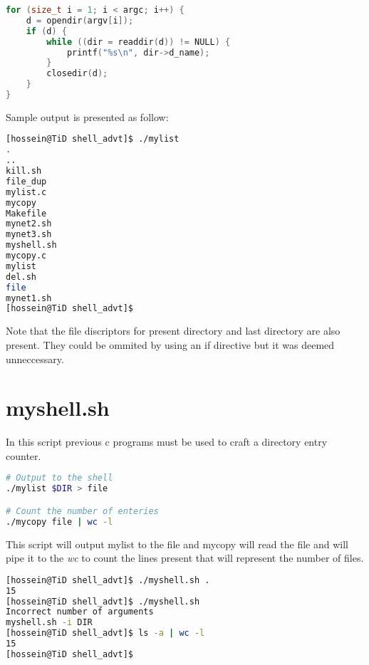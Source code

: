 \documentclass[a4paper, 11pt]{article}
\theoremstyle{nonumberplain}
\begin{document}
\begin{lstlisting}[language=c]
for (size_t i = 1; i < argc; i++) {
    d = opendir(argv[i]);
    if (d) {
        while ((dir = readdir(d)) != NULL) {
            printf("%s\n", dir->d_name);
        }
        closedir(d);
    }
}
\end{lstlisting}
Sample output is presented as follow:
\begin{lstlisting}[language=bash]
[hossein@TiD shell_advt]$ ./mylist
.
..
kill.sh
file_dup
mylist.c
mycopy
Makefile
mynet2.sh
mynet3.sh
myshell.sh
mycopy.c
mylist
del.sh
file
mynet1.sh
[hossein@TiD shell_advt]$
\end{lstlisting}
Note that the file discriptors for present directory and last directory
are also present. They could be ommited by using an if directive but it was
deemed unneccessary.

\section{myshell.sh}
In this script previous c programs must be used to craft a directory entry
counter.
\begin{lstlisting}[language=bash]
# Output to the shell
./mylist $DIR > file

# Count the number of enteries
./mycopy file | wc -l

\end{lstlisting}
This script will output mylist to the file and mycopy will read the file
and will pipe it to the \textit{wc} to count the lines present that will
represent the number of files.
\begin{lstlisting}[language=bash]
[hossein@TiD shell_advt]$ ./myshell.sh .
15
[hossein@TiD shell_advt]$ ./myshell.sh
Incorrect number of arguments
myshell.sh -i DIR
[hossein@TiD shell_advt]$ ls -a | wc -l
15
[hossein@TiD shell_advt]$
\end{lstlisting}

% 
\end{document}
